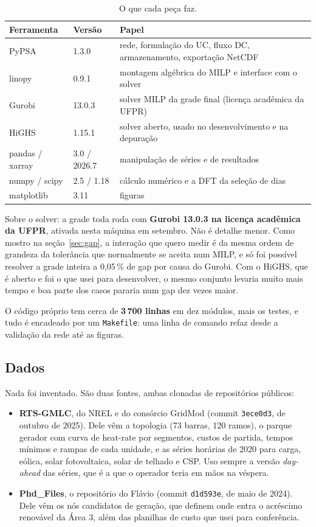 \documentclass[11pt,a4paper]{article}
\begin{document}
\begin{table}[htbp]
\centering\small
\caption{O que cada peça faz.}
\begin{tabular}{@{}llp{8.4cm}@{}}
\toprule
Ferramenta & Versão & Papel \\
\midrule
PyPSA & 1.3.0 & rede, formulação do UC, fluxo DC, armazenamento, exportação NetCDF \\
linopy & 0.9.1 & montagem algébrica do MILP e interface com o solver \\
Gurobi & 13.0.3 & solver MILP da grade final (licença acadêmica da UFPR) \\
HiGHS & 1.15.1 & solver aberto, usado no desenvolvimento e na depuração \\
pandas / xarray & 3.0 / 2026.7 & manipulação de séries e de resultados \\
numpy / scipy & 2.5 / 1.18 & cálculo numérico e a DFT da seleção de dias \\
matplotlib & 3.11 & figuras \\
\bottomrule
\end{tabular}
\end{table}

Sobre o solver: a grade toda roda com \textbf{Gurobi 13.0.3 na licença acadêmica da UFPR}, ativada nesta
máquina em setembro. Não é detalhe menor. Como mostro na seção~\ref{sec:gap}, a interação que quero medir
é da mesma ordem de grandeza da tolerância que normalmente se aceita num MILP, e só foi possível resolver
a grade inteira a 0{,}05\,\% de gap por causa do Gurobi. Com o HiGHS, que é aberto e foi o que usei para
desenvolver, o mesmo conjunto levaria muito mais tempo e boa parte dos casos pararia num gap dez vezes
maior.

O código próprio tem cerca de \textbf{3\,700 linhas} em dez módulos, mais os testes, e tudo é encadeado
por um \texttt{Makefile}: uma linha de comando refaz desde a validação da rede até as figuras.

\subsection{Dados}

Nada foi inventado. São duas fontes, ambas clonadas de repositórios públicos:

\begin{itemize}
\item \textbf{RTS-GMLC}, do NREL e do consórcio GridMod (commit \texttt{3ece0d3}, de outubro de 2025).
Dele vêm a topologia (73 barras, 120 ramos), o parque gerador com curva de heat-rate por segmentos,
custos de partida, tempos mínimos e rampas de cada unidade, e as séries horárias de 2020 para carga,
eólica, solar fotovoltaica, solar de telhado e CSP. Uso sempre a versão \emph{day-ahead} das séries, que é
a que o operador teria em mãos na véspera.
\item \textbf{Phd\_Files}, o repositório do Flávio (commit \texttt{d1d593e}, de maio de 2024). Dele vêm os
nós candidatos de geração, que definem onde entra o acréscimo renovável da Área 3, além das planilhas de
custo que usei para conferência.
\end{itemize}
\end{document}
